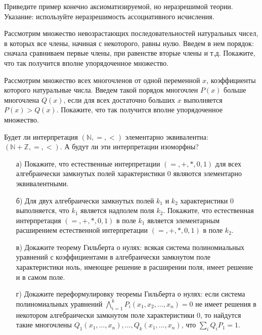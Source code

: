 
\begin{task}
	Приведите пример конечно аксиоматизируемой, но неразрешимой теории. Указание: используйте неразрешимость
    ассоциативного исчисления.
\end{task}

\begin{task}
	Рассмотрим множество невозрастающих последовательностей натуральных чисел, в которых все члены, начиная с
    некоторого, равны нулю. Введем в нем порядок: сначала сравниваем первые члены, при равенстве вторые члены и
    т.д. Покажите, что так получится вполне упорядоченное множество.
\end{task}

\begin{task}
	Рассмотрим множество всех многочленов от одной переменной $x$, коэффициенты которого натуральные числа. Введем такой
    порядок многочлен $P(x)$ больше многочлена $Q(x)$, если для всех достаточно больших $x$ выполняется $P(x) >
    Q(x)$. Покажите, что так получится вполне упорядоченное множество.
\end{task}


\breakline

\begin{ptask}{51}
    Будет ли интерпретация $(\mathbb{N}, =, <)$ элементарно эквивалентна: $(\mathbb{N} + \mathbb{Z}, =, <)$. А будут ли эти
    интерпретации изоморфны?
\end{ptask}

\begin{ptask}{53}
    \begin{enumerate}[topsep = 0pt, itemsep = -1ex]
        \item [а)] Покажите, что естественные интерпретации $(=, +, *, 0, 1)$ для всех алгебраически замкнутых полей
			характеристики $0$ являются элементарно эквивалентными.
        \item [б)] Для двух алгебраически замкнутых полей $k_1$ и $k_2$ характеристики $0$ выполняется, что $k_1$ является
		    надполем поля $k_2$. Покажите, что естественная интерпретация $(=, +, *, 0, 1)$ в поле $k_1$ является элементарным
            расширением естественной интерпретации $(=, +, *, 0, 1)$ в поле $k_2$.
        \item [в)] Докажите теорему Гильберта о нулях: всякая система полиномиальных уравнений с коэффициентами в алгебраически
			замкнутом поле характеристики ноль, имеющее решение в расширении поля, имеет решение и в самом поле.
        \item [г)] Докажите переформулировку теоремы Гильберта о нулях: если система полиномиальных уравнений
        	$\bigwedge\limits_{i = 1}^k P_i(x_1, x_2, \dots, x_n) = 0$ не имеет решения в некотором алгебраически замкнутом поле
            характеристики $0$, то найдутся такие многочлены $Q_1(x_1, \dots, x_n), \dots, Q_k(x_1, \dots, x_n)$, что
            $\sum\limits_i Q_i P_1 = 1$.
    \end{enumerate}
\end{ptask}


